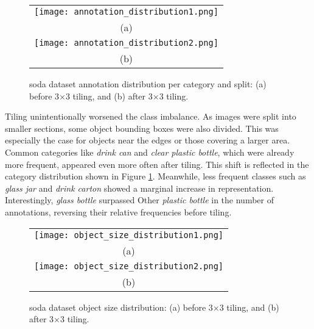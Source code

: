 \begin{figure}[!ht]
  \centering
  \begin{tabular}{c}
    \texttt{[image: annotation\_distribution1.png]} \\
    \small (a) \\
    \addlinespace[1em]
    \texttt{[image: annotation\_distribution2.png]} \\
    \small (b) \\
  \end{tabular}
  \caption{\gls{soda} dataset annotation distribution per category and split: (a) before 3$\times$3 tiling, and (b) after 3$\times$3 tiling.}
  \label{fig:soda_annotation_distribution}
\end{figure}

Tiling unintentionally worsened the class imbalance. As images were split into smaller sections, some object bounding boxes were also divided. This was especially the case for objects near the edges or those covering a larger area. Common categories like \textit{drink can} and \textit{clear plastic bottle}, which were already more frequent, appeared even more often after tiling. This shift is reflected in the category distribution shown in Figure \ref{fig:soda_annotation_distribution}.
Meanwhile, less frequent classes such as \textit{glass jar} and \textit{drink carton} showed a marginal increase in representation. Interestingly, \textit{glass bottle} surpassed Other \textit{plastic bottle} in the number of annotations, reversing their relative frequencies before tiling.


\begin{figure}[!ht]%
  \centering
  \begin{tabular}{c}
    \texttt{[image: object\_size\_distribution1.png]} \\
    \small (a) \\
    \addlinespace[1em]
    \texttt{[image: object\_size\_distribution2.png]} \\
    \small (b) \\
  \end{tabular}
  \caption{\gls{soda} dataset object size distribution: (a) before 3$\times$3 tiling, and (b) after 3$\times$3 tiling.}
  \label{fig:soda_object_size_distribution}
\end{figure}

